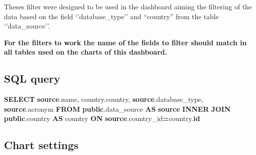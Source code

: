 \documentclass[
]{book}
\newenvironment{Shaded}{\begin{snugshade}}{\end{snugshade}}
\newcommand{\KeywordTok}[1]{\textcolor[rgb]{0.13,0.29,0.53}{\textbf{#1}}}
\newcommand{\NormalTok}[1]{#1}
\newcommand{\OperatorTok}[1]{\textcolor[rgb]{0.81,0.36,0.00}{\textbf{#1}}}
\begin{document}
Theses filter were designed to be used in the dashboard aiming the filtering of the data based on the field `'database\_type'' and ``country'' from the table `'data\_source''.

\textbf{For the filters to work the name of the fields to filter should match in all tables used on the charts of this dashboard.}

\hypertarget{sql-query}{%
\subsection{SQL query}\label{sql-query}}

\begin{Shaded}
\begin{Highlighting}[]
\KeywordTok{SELECT} \KeywordTok{source}\NormalTok{.name,}
\NormalTok{       country.country,}
       \KeywordTok{source}\NormalTok{.database\_type,}
       \KeywordTok{source}\NormalTok{.acronym}
\KeywordTok{FROM} \KeywordTok{public}\NormalTok{.data\_source }\KeywordTok{AS} \KeywordTok{source}
\KeywordTok{INNER} \KeywordTok{JOIN} \KeywordTok{public}\NormalTok{.country }\KeywordTok{AS}\NormalTok{ country }\KeywordTok{ON} \KeywordTok{source}\NormalTok{.country\_id}\OperatorTok{=}\NormalTok{country.}\KeywordTok{id}
\end{Highlighting}
\end{Shaded}

\hypertarget{chart-settings}{%
\subsection{Chart settings}\label{chart-settings}}
\end{document}
